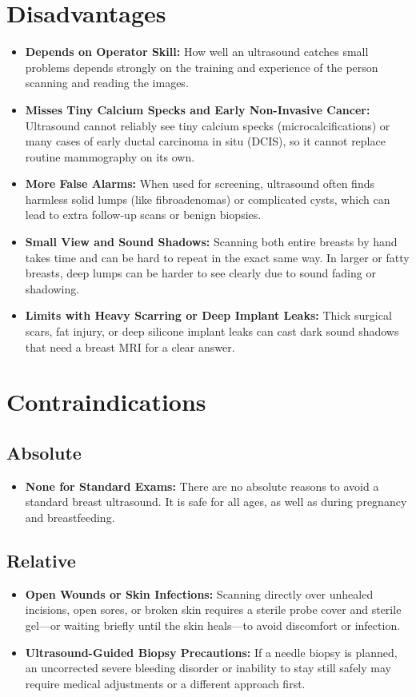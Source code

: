 \section{Disadvantages}
\begin{itemize}
\item \textbf{Depends on Operator Skill:} How well an ultrasound catches small problems depends strongly on the training and experience of the person scanning and reading the images.
\item \textbf{Misses Tiny Calcium Specks and Early Non-Invasive Cancer:} Ultrasound cannot reliably see tiny calcium specks (microcalcifications) or many cases of early ductal carcinoma in situ (DCIS), so it cannot replace routine mammography on its own.
\item \textbf{More False Alarms:} When used for screening, ultrasound often finds harmless solid lumps (like fibroadenomas) or complicated cysts, which can lead to extra follow-up scans or benign biopsies.
\item \textbf{Small View and Sound Shadows:} Scanning both entire breasts by hand takes time and can be hard to repeat in the exact same way. In larger or fatty breasts, deep lumps can be harder to see clearly due to sound fading or shadowing.
\item \textbf{Limits with Heavy Scarring or Deep Implant Leaks:} Thick surgical scars, fat injury, or deep silicone implant leaks can cast dark sound shadows that need a breast MRI for a clear answer.
\end{itemize}

\section{Contraindications}

\subsection{Absolute}
\begin{itemize}
\item \textbf{None for Standard Exams:} There are no absolute reasons to avoid a standard breast ultrasound. It is safe for all ages, as well as during pregnancy and breastfeeding.
\end{itemize}

\subsection{Relative}
\begin{itemize}
\item \textbf{Open Wounds or Skin Infections:} Scanning directly over unhealed incisions, open sores, or broken skin requires a sterile probe cover and sterile gel---or waiting briefly until the skin heals---to avoid discomfort or infection.
\item \textbf{Ultrasound-Guided Biopsy Precautions:} If a needle biopsy is planned, an uncorrected severe bleeding disorder or inability to stay still safely may require medical adjustments or a different approach first.
\end{itemize}

